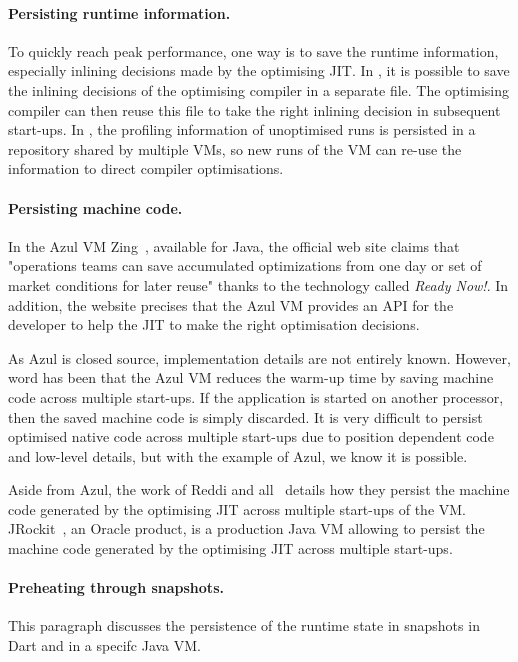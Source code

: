 \documentclass[a4paper,12pt,twoside]{../includes/ThesisStyle}
\begin{document}
\paragraph{Persisting runtime information.}

To quickly reach peak performance, one way is to save the runtime information, especially inlining decisions made by the optimising JIT. In 
 \cite{Sun06}, it is possible to save the inlining decisions of the optimising compiler in a separate file. The optimising compiler can then reuse this file to take the right inlining decision in subsequent start-ups. In \cite{Arno05c}, the profiling information of unoptimised runs is persisted in a repository shared by multiple VMs, so new runs of the VM can re-use the information to direct compiler optimisations.

\paragraph{Persisting machine code.}

In the Azul VM Zing~\cite{Azul}, available for Java, the official web site claims that "operations teams can save accumulated optimizations from one day or set of market conditions for later reuse" thanks to the technology called \emph{Ready Now!}. In addition, the website precises that the Azul VM provides an API for the developer to help the JIT to make the right optimisation decisions. 

As Azul is closed source, implementation details are not entirely known. However, word has been that the Azul VM reduces the warm-up time by saving machine code across multiple start-ups. If the application is started on another processor, then the saved machine code is simply discarded. It is very difficult to persist optimised native code across multiple start-ups due to position dependent code and low-level details, but with the example of Azul, we know it is possible.

Aside from Azul, the work of Reddi and all~\cite{Redd07a} details how they persist the machine code generated by the optimising JIT across multiple start-ups of the VM. JRockit~\cite{JRockit}, an Oracle product, is a production Java VM allowing to persist the machine code generated by the optimising JIT across multiple start-ups.

\paragraph{Preheating through snapshots.} This paragraph discusses the persistence of the runtime state in snapshots in Dart and in a specifc Java VM.
\end{document}
